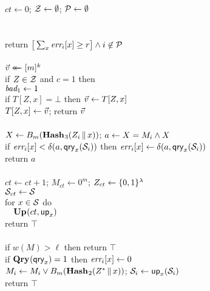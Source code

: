 \begin{figure*}
{
  \vspace{-7pt}
  \hfill{}\\[2pt]
    $ct \gets 0$;
    $\mathcal{Z} \gets \emptyset$;
    $\mathcal{P} \gets \emptyset$\\
    \\
    \\
    return $\big[\sum_x \textit{err}_i[x] \geq r\big] \wedge i \not\in \mathcal{P}$
  \\[6pt]
  \\[2pt]
    $\vec{v} \mathrel{\leftarrow\mkern-14mu\leftarrow} [m]^k$\\
    if $Z \in \mathcal{Z}$ and $c = 1$ then \\
    \tab $\textit{bad}_1 \gets 1$\\
    if $T[Z,x] = \bot$ then $\vec{v} \gets T[Z,x]$\\
    $T[Z,x] \gets \vec{v}$; return $\vec{v}$
  \\[6pt]
  \\[2pt]
    $X \gets {B}_m(\textup{\textbf{Hash}}\hspace{0.5pt}_3(Z_i \, \| \, x))$;
    $a \gets X = M_i \wedge X$\\
    if $\textit{err}_i[x] < \delta(a,\mathsf{qry}_x(\mathcal{S}_i))$ then
          $\textit{err}_i[x] \gets \delta(a,\mathsf{qry}_x(\mathcal{S}_i))$\\
    return $a$
  \\[6pt]
  \oraclev{$\REPO(\col)$}\hfill {}\\[2pt]
    $ct \gets ct+1$;
    $M_{ct} \gets 0^m$;
    $Z_{ct} \gets \{0,1\}^\lambda$\diffplus{$\setminus \setZ$}\\
    $\mathcal{S}_{ct} \gets \mathcal{S}$\\
    for $x \in \mathcal{S}$ do\\
    $\hspace*{10pt}\textup{\textbf{Up}}\hspace{0.5pt}(ct, \mathsf{up}_x)$\\
    return $\top$
  \\[6pt]
  \\[2pt]
    if $w(M) > \ell$ then return $\top$\\
    if $\textup{\textbf{Qry}}\hspace{0.5pt}(\mathsf{qry}_x) = 1$ then $\textit{err}_i[x] \gets 0$\\
    $M_i \gets M_i \vee {B}_m(\textup{\textbf{Hash}}\hspace{0.5pt}_2(Z^* \, \| \, x))$;
    $\mathcal{S}_i \gets \mathsf{up}_x(\mathcal{S}_i)$\\
    return $\top$
}
\end{figure*}
